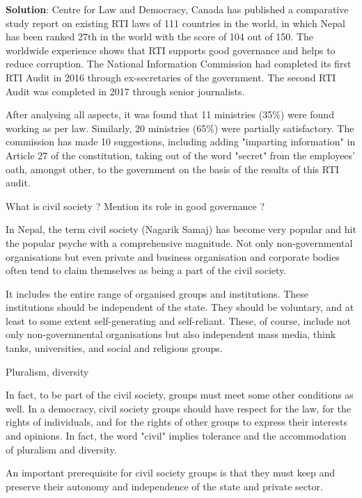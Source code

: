 \documentclass[
  openany]{book}
\newcommand{\question}{\item}
\newenvironment{solution}{ {\bfseries Solution}:}{}
\begin{document}
\begin{questions}
\begin{solution}
Centre for Law and Democracy, Canada has published a comparative study report on existing RTI laws of 111 countries in the world, in which Nepal has been ranked 27th in the world with the score of 104 out of 150. The worldwide experience shows that RTI supports good governance and helps to reduce corruption. The National Information Commission had completed its first RTI Audit in 2016 through ex-secretaries of the government. The second RTI Audit was completed in 2017 through senior journalists.

After analysing all aspects, it was found that 11 ministries (35\%) were found working as per law. Similarly, 20 ministries (65\%) were partially satisfactory. The commission has made 10 suggestions, including adding "imparting information" in Article 27 of the constitution, taking out of the word "secret" from the employees' oath, amongst other, to the government on the basis of the results of this RTI audit.

\end{solution}

\question What is civil society ? Mention its role in good governance ?

In Nepal, the term civil society (Nagarik Samaj) has become very popular and hit the popular psyche with a comprehensive magnitude. Not only non-governmental organisations but even private and business organisation and corporate bodies often tend to claim themselves as being a part of the civil society.

It includes the entire range of organised groups and institutions. These institutions should be independent of the state. They should be voluntary, and at least to some extent self-generating and self-reliant. These, of course, include not only non-governmental organisations but also independent mass media, think tanks, universities, and social and religious groups.

Pluralism, diversity

In fact, to be part of the civil society, groups must meet some other conditions as well. In a democracy, civil society groups should have respect for the law, for the rights of individuals, and for the rights of other groups to express their interests and opinions.  In fact, the word "civil" implies tolerance and the accommodation of pluralism and diversity.

An important prerequisite for civil society groups is that they must keep and preserve their autonomy and independence of the state and private sector.


\end{questions}
\end{document}
